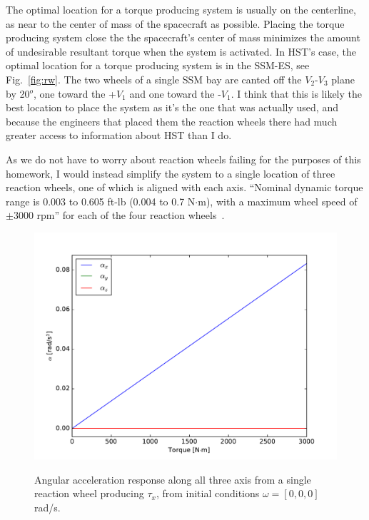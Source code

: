 \documentclass[onecolumn,10pt]{jhwhw}
\begin{document}
The optimal location for a torque producing system is usually on the centerline, as near to the center of mass of the spacecraft as possible. Placing the torque producing system close the the spacecraft's center of mass minimizes the amount of undesirable resultant torque when the system is activated. In HST's case, the optimal location for a torque producing system is in the SSM-ES, see Fig.~\ref{fig:rw}. The two wheels of a single SSM bay are canted off the $V_2$-$V_3$ plane by 20$^o$, one toward the +$V_1$ and one toward the -$V_1$. I think that this is likely the best location to place the system as it's the one that was actually used, and because the engineers that placed them the reaction wheels there had much greater access to information about HST than I do.

As we do not have to worry about reaction wheels failing for the purposes of this homework, I would instead simplify the system to a single location of three reaction wheels, one of which is aligned with each axis. ``Nominal dynamic torque range is 0.003 to 0.605 ft-lb (0.004 to 0.7 N$\cdot$m), with a maximum wheel speed of $\pm$3000 rpm'' for each of the four reaction wheels~\cite{hst}.


\begin{figure}[h!]
\begin{center}
\includegraphics[height=0.4\textheight]{figure3.pdf}
\label{fig:on}
\end{center}
\caption{Angular acceleration response along all three axis from a single reaction wheel producing $\tau_x$, from initial conditions $\omega = [0, 0, 0]$ rad/s.}
\end{figure}
\end{document}
